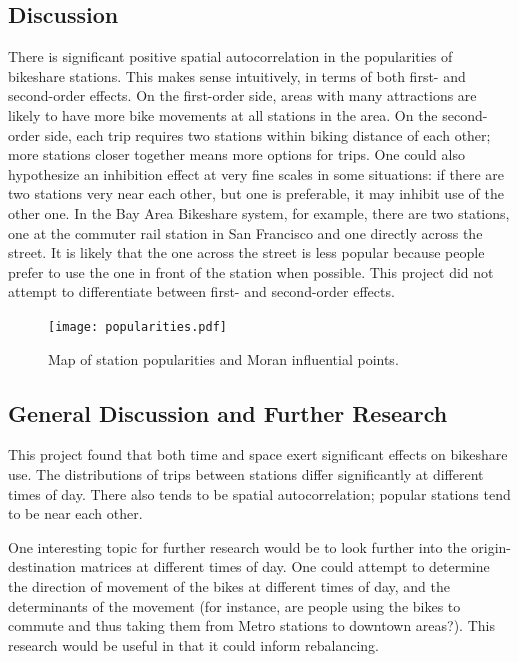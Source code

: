\documentclass[letterpaper,11pt]{article}
\begin{document}


\subsection{Discussion}

There is significant positive spatial autocorrelation in the
popularities of bikeshare stations. This makes sense intuitively, in
terms of both first- and second-order effects. On the first-order
side, areas with many attractions are likely to have more bike
movements at all stations in the area. On the second-order side, each
trip requires two stations within biking distance of each other; more
stations closer together means more options for trips. One could also
hypothesize an inhibition effect at very fine scales in some
situations: if there are two stations very near each other, but one is
preferable, it may inhibit use of the other one. In the Bay Area
Bikeshare system, for example, there are two stations, one at the
commuter rail station in San Francisco and one directly across the
street. It is likely that the one across the street is less popular
because people prefer to use the one in front of the station when
possible. This project did not attempt to differentiate between first-
and second-order effects.

\begin{figure}[t]
  \texttt{[image: popularities.pdf]}
  \caption{\label{fig:map} Map of station popularities and Moran
    influential points.}
\end{figure}

\subsection{General Discussion and Further Research}

This project found that both time and space exert significant effects
on bikeshare use. The distributions of trips between stations differ
significantly at different times of day. There also tends to be
spatial autocorrelation; popular stations tend to be near each other.

One interesting topic for further research would be to look further
into the origin-destination matrices at different times of day. One
could attempt to determine the direction of movement of the bikes at
different times of day, and the determinants of the movement (for
instance, are people using the bikes to commute and thus taking them
from Metro stations to downtown areas?). This research would be useful
in that it could inform rebalancing.
\end{document}
